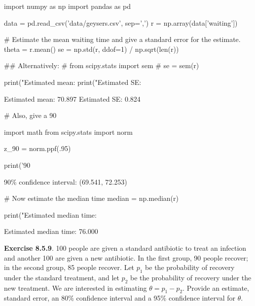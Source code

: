 \begin{python}
import numpy as np
import pandas as pd

data = pd.read_csv('data/geysers.csv', sep=',')
r = np.array(data['waiting'])
\end{python}

\begin{python}
# Estimate the mean waiting time and give a standard error for the estimate.
theta = r.mean()
se = np.std(r, ddof=1) / np.sqrt(len(r))

## Alternatively:
# from scipy.stats import sem
# se = sem(r)

print("Estimated mean: %
print("Estimated SE: %
\end{python}

\begin{console}
Estimated mean: 70.897
Estimated SE: 0.824
\end{console}

\begin{python}
# Also, give a 90%

import math
from scipy.stats import norm

z_90 = norm.ppf(.95)

print('90%
\end{python}

\begin{console}
90\% confidence interval: (69.541, 72.253)
\end{console}

\begin{python}
# Now estimate the median time
median = np.median(r)

print("Estimated median time: %
\end{python}

\begin{console}
Estimated median time: 76.000
\end{console}

\textbf{Exercise 8.5.9}. 100 people are given a standard antibiotic to
treat an infection and another 100 are given a new antibiotic. In the
first group, 90 people recover; in the second group, 85 people recover.
Let \(p_1\) be the probability of recovery under the standard treatment,
and let \(p_2\) be the probability of recovery under the new treatment.
We are interested in estimating \(\theta = p_1 - p_2\). Provide an
estimate, standard error, an 80\% confidence interval and a 95\%
confidence interval for \(\theta\).

